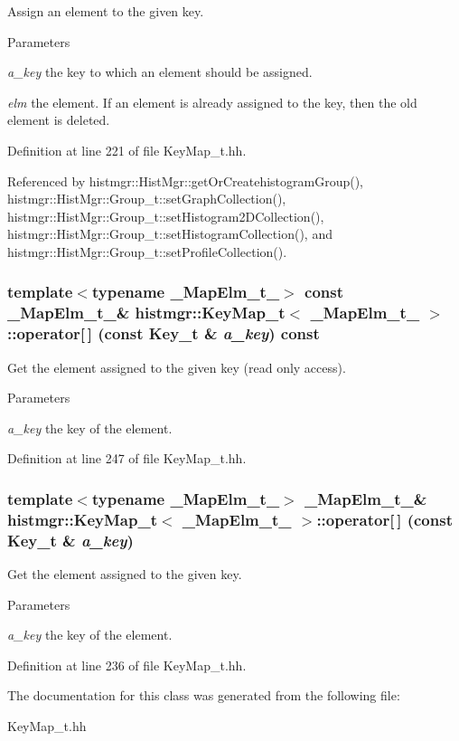 Assign an element to the given key. 
\begin{DoxyParams}{Parameters}
\item[{\em a\_\-key}]the key to which an element should be assigned. \item[{\em elm}]the element. If an element is already assigned to the key, then the old element is deleted. \end{DoxyParams}


Definition at line 221 of file KeyMap\_\-t.hh.

Referenced by histmgr::HistMgr::getOrCreatehistogramGroup(), histmgr::HistMgr::Group\_\-t::setGraphCollection(), histmgr::HistMgr::Group\_\-t::setHistogram2DCollection(), histmgr::HistMgr::Group\_\-t::setHistogramCollection(), and histmgr::HistMgr::Group\_\-t::setProfileCollection().
\subsubsection[{operator[]}]{\setlength{\rightskip}{0pt plus 5cm}template$<$typename \_\-MapElm\_\-t\_\-$>$ const \_\-MapElm\_\-t\_\-\& {\bf histmgr::KeyMap\_\-t}$<$ \_\-MapElm\_\-t\_\- $>$::operator[$\,$] (const {\bf Key\_\-t} \& {\em a\_\-key}) const\hspace{0.3cm}{\ttfamily  [inline]}}\label{classhistmgr_1_1KeyMap__t_a307a82ab48b2708d640cbc783b61a222}


Get the element assigned to the given key (read only access). 
\begin{DoxyParams}{Parameters}
\item[{\em a\_\-key}]the key of the element. \end{DoxyParams}


Definition at line 247 of file KeyMap\_\-t.hh.
\subsubsection[{operator[]}]{\setlength{\rightskip}{0pt plus 5cm}template$<$typename \_\-MapElm\_\-t\_\-$>$ \_\-MapElm\_\-t\_\-\& {\bf histmgr::KeyMap\_\-t}$<$ \_\-MapElm\_\-t\_\- $>$::operator[$\,$] (const {\bf Key\_\-t} \& {\em a\_\-key})\hspace{0.3cm}{\ttfamily  [inline]}}\label{classhistmgr_1_1KeyMap__t_a587283f7ab94b2eef10adfc1ba55dedc}


Get the element assigned to the given key. 
\begin{DoxyParams}{Parameters}
\item[{\em a\_\-key}]the key of the element. \end{DoxyParams}


Definition at line 236 of file KeyMap\_\-t.hh.

The documentation for this class was generated from the following file:\begin{DoxyCompactItemize}
\item 
KeyMap\_\-t.hh\end{DoxyCompactItemize}
